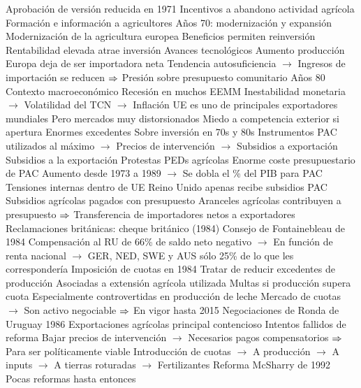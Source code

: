 \documentclass{nuevotema}
\begin{document}
\begin{esquemal}
				\4[$\then$] Aprobación de versión reducida en 1971
				\4[] Incentivos a abandono actividad agrícola
				\4[] Formación e información a agricultores
			\3 Años 70: modernización y expansión
				\4 Modernización de la agricultura europea
				\4[] Beneficios permiten reinversión
				\4[] Rentabilidad elevada atrae inversión
				\4[] Avances tecnológicos
				\4 Aumento producción
				\4[] Europa deja de ser importadora neta
				\4 Tendencia autosuficiencia
				\4[] $\to$ Ingresos de importación se reducen
				\4[] $\then$ Presión sobre presupuesto comunitario
			\3 Años 80
				\4 Contexto macroeconómico
				\4[] Recesión en muchos EEMM
				\4[] Inestabilidad monetaria
				\4[] $\to$ Volatilidad del TCN
				\4[] $\to$ Inflación
				\4 UE es uno de principales exportadores mundiales
				\4[] Pero mercados muy distorsionados
				\4[] Miedo a competencia exterior si apertura
				\4 Enormes excedentes
				\4[] Sobre inversión en 70s y 80s
				\4[] Instrumentos PAC utilizados al máximo
				\4[] $\to$ Precios de intervención
				\4[] $\to$ Subsidios a exportación
				\4 Subsidios a la exportación
				\4[] Protestas PEDs agrícolas
				\4 Enorme coste presupuestario de PAC
				\4[] Aumento desde 1973 a 1989
				\4[] $\to$ Se dobla el \% del PIB para PAC
				\4 Tensiones internas dentro de UE
				\4[] Reino Unido apenas recibe subsidios PAC
				\4[] Subsidios agrícolas pagados con presupuesto
				\4[] Aranceles agrícolas contribuyen a presupuesto
				\4[] $\then$ Transferencia de importadores netos a exportadores
				\4 Reclamaciones británicas: cheque británico (1984)
				\4[] Consejo de Fontainebleau de 1984
				\4[] Compensación al RU de 66\% de saldo neto negativo
				\4[] $\to$ En función de renta nacional
				\4[] $\to$ GER, NED, SWE y AUS sólo 25\% de lo que les correspondería
				\4 Imposición de cuotas en 1984
				\4[] Tratar de reducir excedentes de producción
				\4[] Asociadas a extensión agrícola utilizada
				\4[] Multas si producción supera cuota
				\4[] Especialmente controvertidas en producción de leche
				\4[] Mercado de cuotas
				\4[] $\to$ Son activo negociable
				\4[] $\then$ En vigor hasta 2015
				\4 Negociaciones de Ronda de Uruguay 1986
				\4[] Exportaciones agrícolas principal contencioso
				\4 Intentos fallidos de reforma
				\4[] Bajar precios de intervención
				\4[] $\to$ Necesarios pagos compensatorios
				\4[] $\then$ Para ser políticamente viable
				\4[] Introducción de cuotas
				\4[] $\to$ A producción
				\4[] $\to$ A inputs
				\4[] $\to$ A tierras roturadas
				\4[] $\to$ Fertilizantes
			\3  Reforma McSharry de 1992
				\4 Pocas reformas hasta entonces

\end{esquemal}
\end{document}
